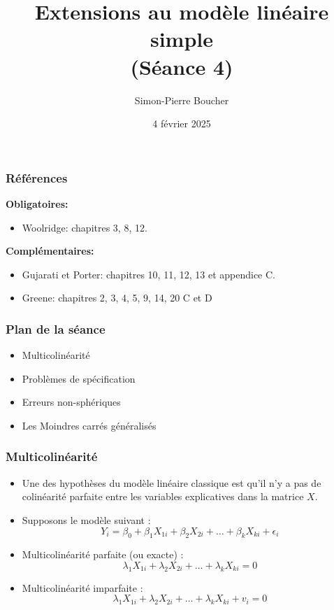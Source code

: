 \documentclass{beamer}
\title{Extensions au modèle linéaire simple \\(Séance 4)}
\author{Simon-Pierre Boucher}
\institute{Département de finance, assurance et immobilier\\ Faculté des sciences de l'administration\\ Université Laval}
\date[Hiver 2025]{4 février 2025}
\begin{document}
\frame{\titlepage}

\begin{frame}
\frametitle{Références}
\textbf{Obligatoires:}
\begin{itemize}
   
    \item Woolridge: chapitres 3, 8, 12.
\end{itemize}
\textbf{Complémentaires:}
\begin{itemize}
    \item Gujarati et Porter: chapitres 10, 11, 12, 13 et appendice C.
    \item Greene: chapitres 2, 3, 4, 5, 9, 14, 20 C et D
\end{itemize}
\end{frame}

\begin{frame}
\frametitle{Plan de la séance}
\begin{itemize}
    \item Multicolinéarité
    \item Problèmes de spécification
    \item Erreurs non-sphériques
    \item Les Moindres carrés généralisés
\end{itemize}
\end{frame}

\begin{frame}
\frametitle{Multicolinéarité}
\begin{itemize}
    \item Une des hypothèses du modèle linéaire classique est qu’il n’y a pas de colinéarité parfaite entre les variables explicatives dans la matrice \( X \).
    \item Supposons le modèle suivant :
    \[
    Y_i = \beta_0 + \beta_1 X_{1i} + \beta_2 X_{2i} + \dots + \beta_k X_{ki} + \epsilon_i
    \]
    \item Multicolinéarité parfaite (ou exacte) :
    \[
    \lambda_1 X_{1i} + \lambda_2 X_{2i} + \dots + \lambda_k X_{ki} = 0
    \]
    \item Multicolinéarité imparfaite :
    \[
    \lambda_1 X_{1i} + \lambda_2 X_{2i} + \dots + \lambda_k X_{ki} + v_i = 0
    \]
\end{itemize}
\end{frame}
\end{document}
